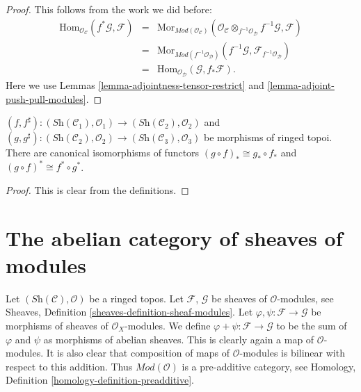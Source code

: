 \begin{proof}
This follows from the work we did before:
\begin{eqnarray*}
\text{Hom}_{\mathcal{O}_{\mathcal{C}}}(f^*\mathcal{G}, \mathcal{F})
& = &
\text{Mor}_{\textit{Mod}(\mathcal{O}_{\mathcal{C}})}(
\mathcal{O}_{\mathcal{C}}
\otimes_{f^{-1}\mathcal{O}_{\mathcal{D}}} f^{-1}\mathcal{G},
\mathcal{F}) \\
& = &
\text{Mor}_{\textit{Mod}(f^{-1}\mathcal{O}_{\mathcal{D}})}(
f^{-1}\mathcal{G}, \mathcal{F}_{f^{-1}\mathcal{O}_{\mathcal{D}}}) \\
& = &
\text{Hom}_{\mathcal{O}_{\mathcal{D}}}(\mathcal{G}, f_*\mathcal{F}).
\end{eqnarray*}
Here we use Lemmas \ref{lemma-adjointness-tensor-restrict}
and \ref{lemma-adjoint-push-pull-modules}.
\end{proof}

\begin{lemma}
\label{lemma-push-pull-composition-modules}
$(f, f^\sharp) :
(\textit{Sh}(\mathcal{C}_1), \mathcal{O}_1)
\to (\textit{Sh}(\mathcal{C}_2), \mathcal{O}_2)$ and
$(g, g^\sharp) :
(\textit{Sh}(\mathcal{C}_2), \mathcal{O}_2) \to
(\textit{Sh}(\mathcal{C}_3), \mathcal{O}_3)$
be morphisms of ringed topoi.
There are canonical isomorphisms of functors
$(g \circ f)_* \cong g_* \circ f_*$ and
$(g \circ f)^* \cong f^* \circ g^*$.
\end{lemma}

\begin{proof}
This is clear from the definitions.
\end{proof}





\section{The abelian category of sheaves of modules}
\label{section-kernels}

\noindent
Let $(\textit{Sh}(\mathcal{C}), \mathcal{O})$ be a ringed topos.
Let $\mathcal{F}$, $\mathcal{G}$ be sheaves of $\mathcal{O}$-modules, see
Sheaves, Definition \ref{sheaves-definition-sheaf-modules}.
Let $\varphi, \psi : \mathcal{F} \to \mathcal{G}$
be morphisms of sheaves of $\mathcal{O}_X$-modules.
We define $\varphi + \psi : \mathcal{F} \to \mathcal{G}$
to be the sum of $\varphi$ and $\psi$ as morphisms of abelian sheaves.
This is clearly again a map of $\mathcal{O}$-modules.
It is also clear that composition of maps of
$\mathcal{O}$-modules is bilinear with respect to this
addition. Thus $\textit{Mod}(\mathcal{O})$ is a pre-additive
category, see Homology, Definition \ref{homology-definition-preadditive}.

